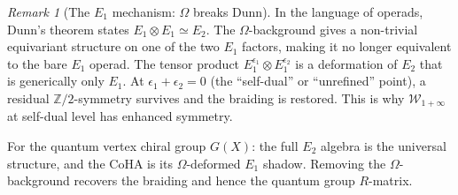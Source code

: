 \documentclass[11pt]{article}
\theoremstyle{definition}
\theoremstyle{remark}
\newtheorem{remark}[theorem]{Remark}
\newcommand{\ZZ}{\mathbb{Z}}
\begin{document}
\begin{remark}[The $E_1$ mechanism: $\Omega$ breaks Dunn]
\label{rem:omega-breaks-dunn}
In the language of operads, Dunn's theorem states
$E_1 \otimes E_1 \simeq E_2$. The $\Omega$-background
gives a non-trivial equivariant structure on one of the
two $E_1$ factors, making it no longer equivalent to the
bare $E_1$ operad. The tensor product
$E_1^{\epsilon_1} \otimes E_1^{\epsilon_2}$ is a deformation
of $E_2$ that is generically only $E_1$. At
$\epsilon_1 + \epsilon_2 = 0$ (the ``self-dual'' or
``unrefined'' point), a residual $\ZZ/2$-symmetry survives
and the braiding is restored. This is why
$\mathcal{W}_{1+\infty}$ at self-dual level has enhanced
symmetry.
\end{remark}

\noindent
For the quantum vertex chiral group $G(X)$: the full $E_2$
algebra is the universal structure, and the CoHA is its
$\Omega$-deformed $E_1$ shadow. Removing the
$\Omega$-background recovers the braiding and hence the
quantum group $R$-matrix.
\end{document}
